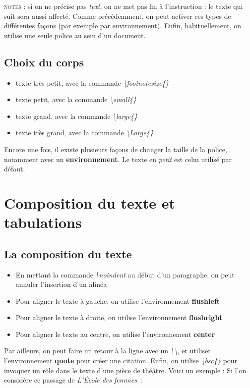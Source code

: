 \documentclass[a4paper, 10pt]{book}
\begin{document}
\textsc{notes :} si on ne précise pas \textit{text}, on ne met pas fin à l'instruction : le texte qui suit sera aussi affecté. Comme précédemment, on peut activer ces types de différentes façons (par exemple par environnement). Enfin, habituellement, on utilise une seule police au sein d'un document.

\subsection{Choix du corps}

\begin{itemize}
\item \footnotesize{texte très petit}, avec la commande \textit{\textbackslash footnotesize\{\}}
\item \small{texte petit}, avec la commande \textit{\textbackslash small\{\}}
\item \large{texte grand}, avec la commande \textit{\textbackslash large\{\}}
\item \Large{texte très grand}, avec la commande \textit{\textbackslash Large\{\}}
\end{itemize}

Encore une fois, il existe plusieurs façons de changer la taille de la police, notamment avec un \textbf{environnement}. Le texte en \textit{petit} est celui utilisé par défaut.

\section{Composition du texte et tabulations}
\subsection{La composition du texte}

\begin{itemize}
\item En mettant la commande \textit{\textbackslash noindent} au début d'un paragraphe, on peut annuler l'insertion d'un alinéa
\item Pour aligner le texte à gauche, on utilise l'environnement \textbf{flushleft}
\item Pour aligner le texte à droite, on utilise l'environnement \textbf{flushright}
\item Pour aligner le texte au centre, on utilise l'environnement \textbf{center}
\end{itemize}

Par ailleurs, on peut faire un retour à la ligne avec un \textit{\textbackslash \textbackslash}, et utiliser l'environnement \textbf{quote} pour créer une citation. Enfin, on utilise \textit{\textbackslash bsc\{\}} pour invoquer un rôle dans le texte d'une pièce de théâtre. Voici un exemple : 
Si l'on considère ce passage de \emph{L'\'Ecole des femmes}~:
\end{document}
